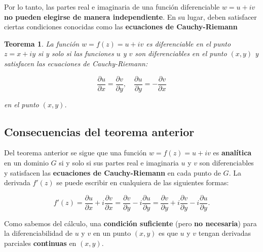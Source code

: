 \documentclass[10pt,a4paper]{book}
\newtheorem{theorem}{Teorema}[section]
\begin{document}
Por lo tanto, las partes real e imaginaria de una funci\'on diferenciable $ w = u + iv $ \textbf{no pueden elegirse de manera independiente}. En su lugar, deben satisfacer ciertas condiciones conocidas como las \textbf{ecuaciones de Cauchy-Riemann}

\begin{theorem}
    La funci\'on $ w = f(z) = u + iv $ es diferenciable en el punto $ z = x + iy $ si y solo si las funciones $ u $ y $ v $ son diferenciables en el punto $ (x, y) $ y satisfacen las ecuaciones de Cauchy-Riemann:
    
    \begin{equation}
        \frac{\partial u}{\partial x} = \frac{\partial v}{\partial y}, \quad \frac{\partial u}{\partial y} = -\frac{\partial v}{\partial x}
    \end{equation}
    
    en el punto $ (x, y) $.
\end{theorem}

\subsection{Consecuencias del teorema anterior}

Del teorema anterior se sigue que una funci\'on $ w = f(z) = u + iv $ es \textbf{anal\'itica} en un dominio $ G $ si y solo si sus partes real e imaginaria $ u $ y $ v $ son diferenciables y satisfacen las \textbf{ecuaciones de Cauchy-Riemann} en cada punto de $ G $. La derivada $ f'(z) $ se puede escribir en cualquiera de las siguientes formas:

\begin{equation}
    f'(z) = \frac{\partial u}{\partial x} + i \frac{\partial v}{\partial x} = \frac{\partial v}{\partial y} - i \frac{\partial u}{\partial y} = \frac{\partial v}{\partial y} + i \frac{\partial v}{\partial y} - i \frac{\partial u}{\partial y}.
\end{equation}

Como sabemos del c\'alculo, una \textbf{condici\'on suficiente} (pero \textbf{no necesaria}) para la diferenciabilidad de $ u $ y $ v $ en un punto $ (x,y) $ es que $ u $ y $ v $ tengan derivadas parciales \textbf{continuas} en $ (x,y) $. 
\end{document}
